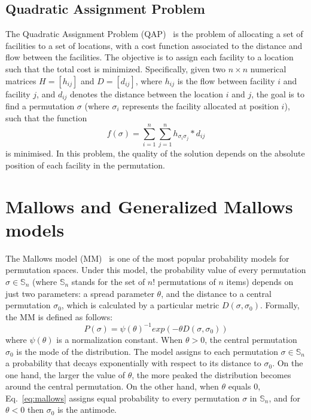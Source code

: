 \documentclass[conference]{IEEEtran}
\begin{document}
\subsection{Quadratic Assignment Problem}
The Quadratic Assignment Problem (QAP)~\cite{koopmans1955} is the problem of allocating a set of facilities to a set of locations, with a cost function associated to the distance and flow between the facilities. The objective is to assign each facility to a location such that the total cost is minimized. Specifically, given two $n \times n$ numerical matrices $H = [h_{ij}]$ and $D = [d_{ij}]$, where $h_{ij}$ is the flow between facility $i$ and facility $j$, and $d_{ij}$ denotes the distance between the location $i$ and $j$, the goal is to find a permutation $\sigma$ (where $\sigma_i$ represents the facility allocated at position $i$), such that the function \[f(\sigma)= \sum_{i=1}^n \sum_{j=1}^n h_{\sigma_i\sigma_j}*d_{ij}\]is minimised. In this problem, the quality of the solution depends on the absolute position of each facility in the permutation.   

\section{Mallows and Generalized Mallows models}
\label{sec:models} %
The Mallows model (MM)~\cite{mallows} is one of the most popular probability models for permutation spaces. Under this model, the probability value of every permutation $\sigma \in \mathbb{S}_n$ (where $\mathbb{S}_n$ stands for the set of $n!$ permutations of $n$ items) depends on just two parameters: a spread parameter $\theta$, and the distance to a central permutation $\sigma_0$, which is calculated by a particular metric $D(\sigma,  \sigma_0)$. Formally, the MM is defined as follows:
\begin{equation}
P(\sigma)= \psi(\theta)^{-1}exp(-\theta D(\sigma,\sigma_0)) 
\label{eq:mallows}
\end{equation}
\noindent 
where $\psi(\theta)$ is a normalization constant. When $\theta > 0$, the central permutation $\sigma_0$ is the mode of the distribution. The model assigns to each permutation $\sigma \in \mathbb{S}_n$ a probability that decays exponentially with respect to its distance to  $\sigma_0$. On the one hand, the larger the value of $\theta$, the more peaked the distribution becomes around the central permutation. On the other hand, when $\theta$ equals 0, Eq.~\ref{eq:mallows} assigns equal probability to every permutation $\sigma$ in $\mathbb{S}_n$, and for $\theta < 0$ then $\sigma_0$ is the antimode. 
\end{document}
